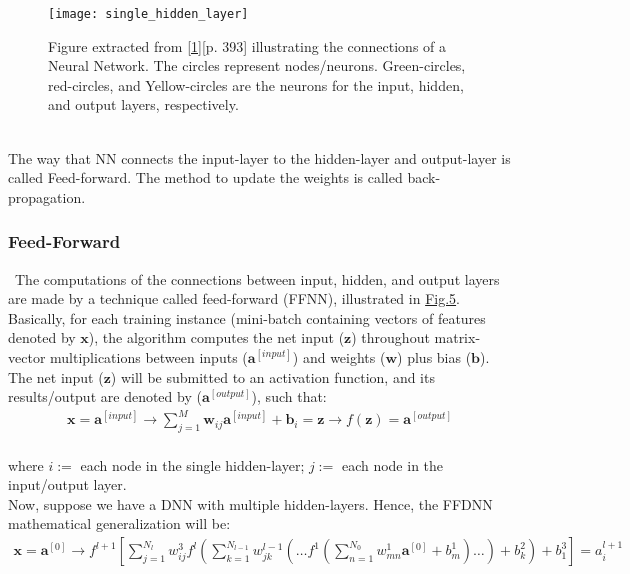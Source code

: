 \begin{figure}[H]
\label{fig:fig5}
\centering
\texttt{[image: single\_hidden\_layer]}
\caption{Figure extracted from \hyperref[Bib:The Elements Of Statistical Learning DataMining]{[1]}[p. 393] illustrating the connections of a Neural Network. The circles represent nodes/neurons. Green-circles, red-circles, and  Yellow-circles are the neurons for the input, hidden, and output layers, respectively.}
\end{figure}\\

The way that NN connects the input-layer to the hidden-layer and output-layer is called Feed-forward. The method to update the weights is called back-propagation.\\

\subsubsection{Feed-Forward}
\label{chap:Feed-Forward}

\qquad \, The computations of the connections between input, hidden, and output layers are made by a technique called feed-forward (FFNN), illustrated in \hyperref[fig:fig5]{Fig.5}. Basically, for each training instance (mini-batch containing vectors of features denoted by $\textbf{x}$), the algorithm computes the net input ($\textbf{z}$) throughout matrix-vector multiplications between inputs ($\textbf{a}^{[input]}$) and weights ($\textbf{w}$) plus bias ($\textbf{b}$). The net input ($\textbf{z}$) will be submitted to an activation function, and its results/output are denoted by ($\textbf{a}^{[output]}$), such that:\\

\begin{align*}
\textbf{x} = \textbf{a}^{[input]} \rightarrow \sum_{j=1}^{M} \textbf{w}_{ij} \textbf{a}^{[input]} + \textbf{b}_i = \textbf{z}
\rightarrow f(\textbf{z}) = \textbf{a}^{[output]}
\end{align*}\\

\noindent where $i :=$ each node in the single hidden-layer; $j :=$ each node in the input/output layer.\\

Now, suppose we have a DNN with multiple hidden-layers. Hence, the FFDNN mathematical generalization will be:\\

\begin{align*}
\textbf{x} = \textbf{a}^{[0]} \rightarrow f^{l+1}\left[\!\sum_{j=1}^{N_l} w_{ij}^3 f^l\left(\sum_{k=1}^{N_{l-1}}w_{jk}^{l-1}\left(\dots f^1\left(\sum_{n=1}^{N_0} w_{mn}^1 \textbf{a}^{[0]}+ b_m^1\right)\dots\right)+b_k^2\right)+b_1^3\right] = a^{l+1}_i
\end{align*}\\

